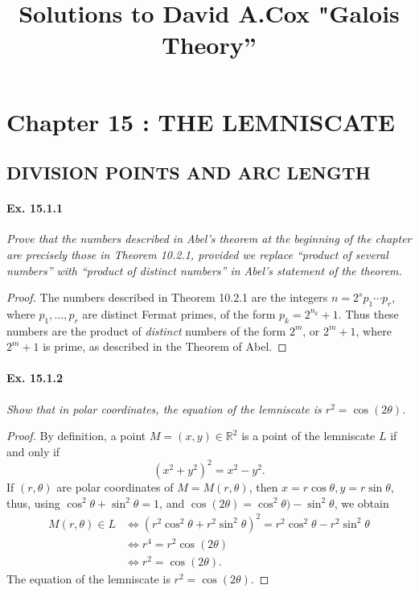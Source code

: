 \documentclass[11pt,a4paper]{article}
\title{Solutions to David A.Cox  "Galois Theory''}
\newcommand{\R}{\mathbb{R}}
\begin{document}
\section{Chapter 15 : THE LEMNISCATE}

\subsection{DIVISION POINTS AND ARC LENGTH}

\paragraph{Ex. 15.1.1}{\it Prove that the numbers described in Abel's theorem at the beginning of the chapter are precisely those in Theorem 10.2.1, provided we replace ``product of several numbers'' with ``product of distinct numbers'' in Abel's statement of the theorem.
}
\begin{proof}
The numbers described in Theorem 10.2.1 are the integers $n = 2^s p_1\cdots p_r$, where $p_1,\ldots,p_r$ are distinct Fermat primes, of the form $p_k = 2^{n_k} + 1$. Thus these numbers are the product of {\it distinct} numbers of the form $2^m$, or $2^{m}+1$, where $2^{m} + 1$ is prime, as described in the Theorem of Abel.
\end{proof}

\paragraph{Ex. 15.1.2}{\it Show that in polar coordinates, the equation of the lemniscate is $r^2 = \cos(2\theta)$.
}
\begin{proof}
By definition, a point $M = (x,y) \in \R^2$ is a point of the lemniscate $L$ if and only if
$$(x^2 + y^2)^2 = x^2 - y^2.$$ 
If $(r,\theta)$ are polar coordinates of $M = M(r,\theta)$, then $x = r \cos\theta, y = r \sin\theta$, thus, using $\cos^2 \theta + \sin^2 \theta = 1$, and $\cos(2\theta) = \cos^2 \theta) - \sin^2 \theta$, we obtain
\begin{align*}
M(r,\theta) \in L & \iff (r^2 \cos^2\theta + r^2 \sin^2\theta)^2 = r^2 \cos^2\theta - r^2 \sin^2\theta\\
&\iff r^4 = r^2 \cos(2\theta)\\
&\iff r^2 = \cos(2\theta).
\end{align*}
The equation of the lemniscate is $r^2 = \cos(2\theta)$.
\end{proof}
\end{document}
